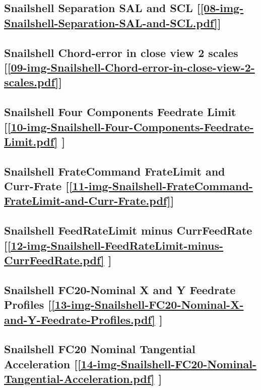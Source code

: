 \subsection       {Snailshell Separation SAL and SCL
	[\ref      {08-img-Snailshell-Separation-SAL-and-SCL.pdf}] }
\label{ssec-08-img-Snailshell-Separation-SAL-and-SCL.pdf}

\subsection       {Snailshell Chord-error in close view 2 scales
	[\ref      {09-img-Snailshell-Chord-error-in-close-view-2-scales.pdf}] }
\label{ssec-09-img-Snailshell-Chord-error-in-close-view-2-scales.pdf}

\subsection       {Snailshell Four Components Feedrate Limit
	[\ref      {10-img-Snailshell-Four-Components-Feedrate-Limit.pdf} ] }
\label{ssec-10-img-Snailshell-Four-Components-Feedrate-Limit.pdf}

\subsection    {Snailshell FrateCommand FrateLimit and Curr-Frate
	[\ref      {11-img-Snailshell-FrateCommand-FrateLimit-and-Curr-Frate.pdf}] }
\label{ssec-11-img-Snailshell-FrateCommand-FrateLimit-and-Curr-Frate.pdf}

\subsection     {Snailshell FeedRateLimit minus CurrFeedRate
	[\ref      {12-img-Snailshell-FeedRateLimit-minus-CurrFeedRate.pdf} ] }
\label{ssec-12-img-Snailshell-FeedRateLimit-minus-CurrFeedRate.pdf}

\subsection     {Snailshell FC20-Nominal X and Y Feedrate Profiles
	[\ref      {13-img-Snailshell-FC20-Nominal-X-and-Y-Feedrate-Profiles.pdf} ] }
\label{ssec-13-img-Snailshell-FC20-Nominal-X-and-Y-Feedrate-Profiles.pdf}

\subsection     {Snailshell FC20 Nominal Tangential Acceleration
	[\ref      {14-img-Snailshell-FC20-Nominal-Tangential-Acceleration.pdf} ] }
\label{ssec-14-img-Snailshell-FC20-Nominal-Tangential-Acceleration.pdf}

